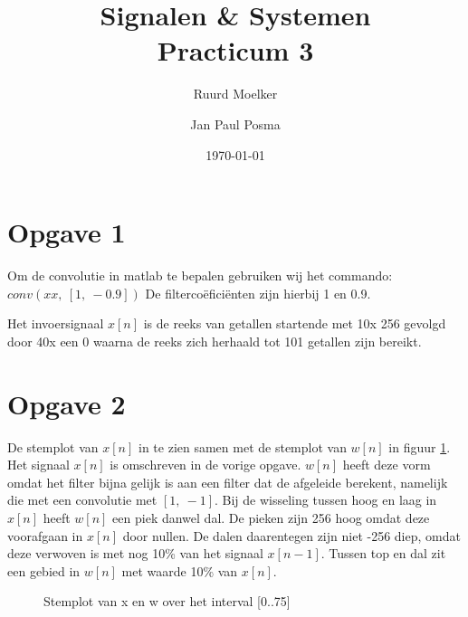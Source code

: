 \documentclass{article}
\author{Ruurd Moelker \and Jan Paul Posma}
\date{\today}
\title{Signalen \& Systemen \\Practicum 3}
\begin{document}
\maketitle

\section{Opgave 1}
Om de convolutie in matlab te bepalen gebruiken wij het commando:
$conv(xx,~[1,~-0.9])$
De filterco\"efici\"enten zijn hierbij 1 en 0.9.

Het invoersignaal $x[n]$ is de reeks van getallen startende met 10x 256 gevolgd
door 40x een 0 waarna de reeks zich herhaald tot 101 getallen zijn bereikt.

\section{Opgave 2}
De stemplot van $x[n]$ in te zien samen met de stemplot van $w[n]$ in figuur
\ref{fig_opgave2}. Het signaal $x[n]$ is omschreven in de vorige opgave. $w[n]$
heeft deze vorm omdat het filter bijna gelijk is aan een filter dat de
afgeleide berekent, namelijk die met een convolutie met $[1,~-1]$. Bij de
wisseling tussen hoog en laag in $x[n]$ heeft $w[n]$ een piek danwel dal. De
pieken zijn 256 hoog omdat deze voorafgaan in $x[n]$ door nullen. De dalen
daarentegen zijn niet -256 diep, omdat deze verwoven is met nog 10\% van het
signaal $x[n-1]$. Tussen top en dal zit een gebied in $w[n]$ met waarde 10\% van $x[n]$.

\begin{figure}[h]
  \centering
  \caption{Stemplot van x en w over het interval [0..75]}
  \label{fig_opgave2}
\end{figure}
\end{document}
